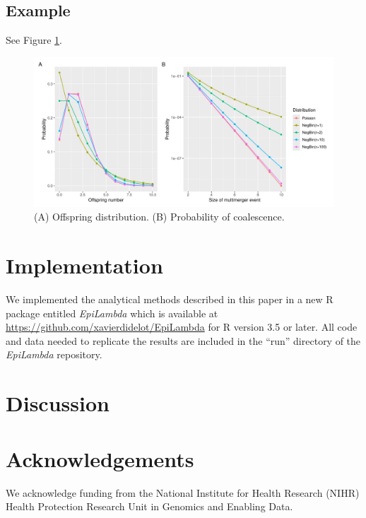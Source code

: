 \documentclass{article}
\begin{document}
\subsection{Example}

See Figure \ref{fig:probs}.

\begin{figure}[t!]
\begin{center}
\includegraphics[width=15cm]{../run/figure.pdf}
\end{center}
\caption{(A) Offspring distribution. (B) Probability of coalescence.
\label{fig:probs}}
\end{figure}

\section{Implementation}

We implemented the analytical methods described in this paper in a 
new R package entitled \emph{EpiLambda} which is available
at \url{https://github.com/xavierdidelot/EpiLambda} for R version 3.5 or later. 
All code and data needed to replicate the results are included in the ``run'' directory of the \emph{EpiLambda} repository.

\section{Discussion}

\section*{Acknowledgements}

We acknowledge funding from the National Institute for Health Research (NIHR) Health Protection Research Unit in Genomics and Enabling Data.

\newpage


\end{document}
